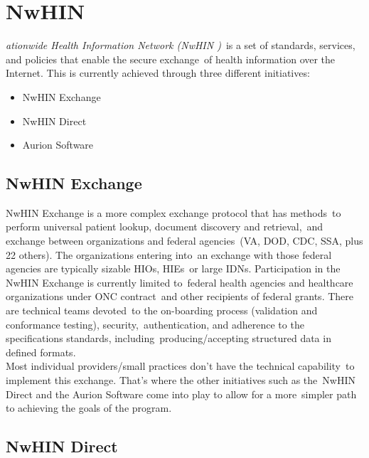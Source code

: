   \section[Nationwide Health Information Network (NwHIN)]{NwHIN}
  \label{sec:nwhin}

  \textit{ationwide Health Information Network (NwHIN )}\
  is a set of standards, services, and policies that enable the secure exchange\
  of health information over the Internet.\citep{_nwhin_framework_2013}
 This is currently achieved through three different initiatives:\
  \begin{itemize}
    \itemsep0ex
    \item  NwHIN Exchange
    \item  NwHIN Direct 
    \item Aurion Software
  \end{itemize}

  \subsection{NwHIN Exchange}

 	NwHIN Exchange is a more complex exchange protocol that has methods\
to perform universal patient lookup, document discovery and retrieval,\
 and exchange between organizations and federal agencies\
 (VA, DOD, CDC, SSA, plus 22 others). The organizations entering into\
 an exchange with those federal agencies are typically sizable HIOs, HIEs\
or large IDNs. Participation in the NwHIN Exchange is currently limited to\
federal health agencies and healthcare organizations under ONC contract\
 and other recipients of federal grants. There are technical teams devoted\
 to the on-boarding process (validation and conformance testing), security,\
 authentication, and adherence to the specifications standards, including\
 producing/accepting structured data in defined formats.\
\citep{_nwhin_exchange_2013}\\

  \noindent Most individual providers/small practices don't have the technical capability\
 to implement this exchange. That's where the other initiatives such as the\
NwHIN Direct and the Aurion Software come into play to allow for a more\
 simpler path to achieving the goals of the program.\\

 \subsection{NwHIN Direct}

